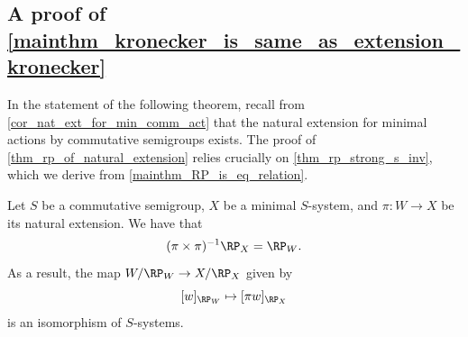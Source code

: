 \subsection{A proof of \cref{mainthm_kronecker_is_same_as_extension_kronecker}}
\label{sec_proof_of_same_kron}

In the statement of the following theorem, recall from \cref{cor_nat_ext_for_min_comm_act} that the natural extension for minimal actions by commutative semigroups exists.
The proof of \cref{thm_rp_of_natural_extension} relies crucially on \cref{thm_rp_strong_s_inv}, which we derive from \cref{mainthm_RP_is_eq_relation}.

\begin{theorem}
\label{thm_rp_of_natural_extension}
    Let $S$ be a commutative semigroup, $X$ be a minimal $S$-system, and $\pi: W \to X$ be its natural extension. We have that
    \[
        (\pi \times \pi)^{-1} \RP_X = \RP_W.
    \]
    As a result, the map $W/ \RP_W \to X / \RP_X$ given by 
    \[[w]_{\RP_W} \mapsto [\pi w]_{\RP_X}\]
    is an isomorphism of $S$-systems.
\end{theorem}

